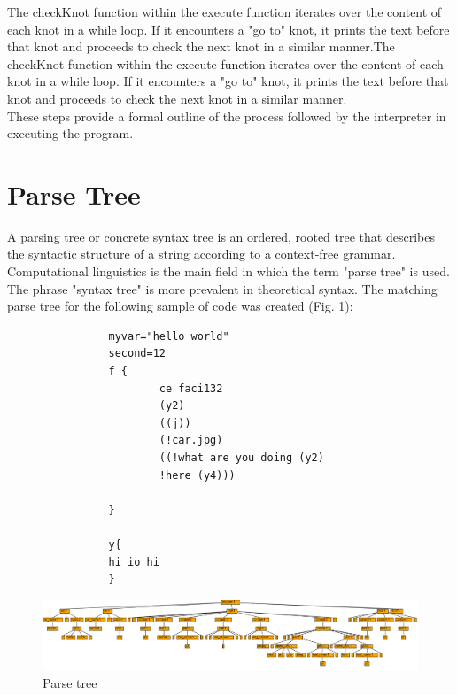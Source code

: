 \noindent The checkKnot function within the execute function iterates over the content of each knot in a while loop. If it encounters a "go to" knot, it prints the text before that knot and proceeds to check the next knot in a similar manner.The checkKnot function within the execute function iterates over the content of each knot in a while loop. If it encounters a "go to" knot, it prints the text before that knot and proceeds to check the next knot in a similar manner.
\\These steps provide a formal outline of the process followed by the interpreter in executing the program.
\section{Parse Tree}
        A parsing tree or concrete syntax tree is an ordered, rooted tree that describes the syntactic structure of a string according to a context-free grammar. Computational linguistics is the main field in which the term "parse tree" is used. 
        The phrase "syntax tree" is more prevalent in theoretical syntax. The matching parse tree for the following sample of code was created (Fig. 1):
        
        \begin{verbatim}
                myvar="hello world"
                second=12
                f {
                        ce faci132
                        (y2)
                        ((j))
                        (!car.jpg)
                        ((!what are you doing (y2)
                        !here (y4)))
                    
                }
                
                y{
                hi io hi
                }     
        \end{verbatim}
        

\begin{figure}[h]
    \centering
    \includegraphics[width=\textwidth]{images/parsetree.png}
    \caption{Parse tree}
    \label{fig:parsetree}
\end{figure}

